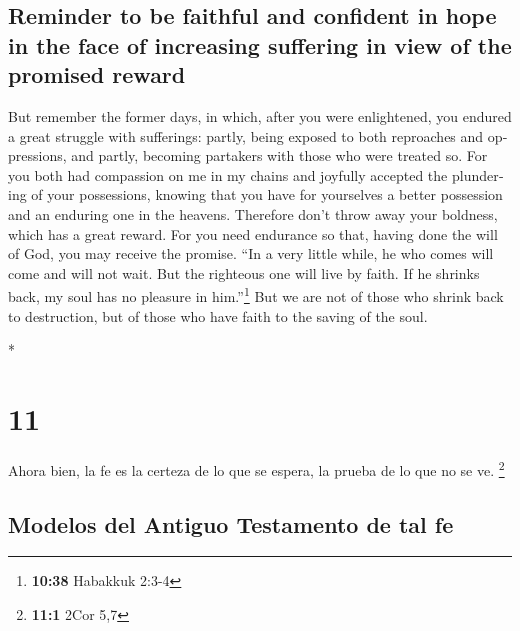 \begin{paracol}{2}
\begin{otherlanguage}{english}
\hypertarget{reminder-to-be-faithful-and-confident-in-hope-in-the-face-of-increasing-suffering-in-view-of-the-promised-reward}{%
\subsection{Reminder to be faithful and confident in hope in the face of
increasing suffering in view of the promised
reward}\label{reminder-to-be-faithful-and-confident-in-hope-in-the-face-of-increasing-suffering-in-view-of-the-promised-reward}}

 But remember the former days, in which, after you were
enlightened, you endured a great struggle with sufferings:
 partly, being exposed to both reproaches and
oppressions, and partly, becoming partakers with those who were treated
so.  For you both had compassion on me in my chains and
joyfully accepted the plundering of your possessions, knowing that you
have for yourselves a better possession and an enduring one in the
heavens.  Therefore don't throw away your boldness, which
has a great reward.  For you need endurance so that,
having done the will of God, you may receive the promise.
 ``In a very little while, he who comes will come and
will not wait.  But the righteous one will live by faith.
If he shrinks back, my soul has no pleasure in him.''\footnote{\textbf{10:38}
  Habakkuk 2:3-4}  But we are not of those who shrink
back to destruction, but of those who have faith to the saving of the
soul.

\end{otherlanguage}

\switchcolumn[0]*

\hypertarget{section-20}{%
\section{11}\label{section-20}}

 Ahora bien, la fe es la certeza de lo que se espera, la
prueba de lo que no se ve. \footnote{\textbf{11:1} 2Cor 5,7}

\hypertarget{modelos-del-antiguo-testamento-de-tal-fe}{%
\subsection{Modelos del Antiguo Testamento de tal
fe}\label{modelos-del-antiguo-testamento-de-tal-fe}}


\end{paracol}
